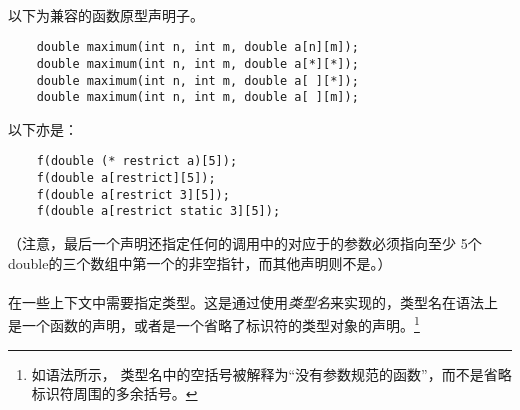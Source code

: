 {\paragraph{}
\ex 以下为兼容的函数原型声明子。
\begin{lstlisting}
    double maximum(int n, int m, double a[n][m]);
    double maximum(int n, int m, double a[*][*]);
    double maximum(int n, int m, double a[ ][*]);
    double maximum(int n, int m, double a[ ][m]);
\end{lstlisting}
以下亦是：
\begin{lstlisting}
    f(double (* restrict a)[5]);
    f(double a[restrict][5]);
    f(double a[restrict 3][5]);
    f(double a[restrict static 3][5]);
\end{lstlisting}
（注意，最后一个声明还指定任何的调用中的对应于的参数必须指向至少
5个double的三个数组中第一个的非空指针，而其他声明则不是。）


\syntax
\paragraph{}

\semantic
\paragraph{}
在一些上下文中需要指定类型。这是通过使用\textit{类型名}来实现的，类型名在语法上
是一个函数的声明，或者是一个省略了标识符的类型对象的声明。\footnote{如语法所示，
类型名中的空括号被解释为``没有参数规范的函数''，而不是省略标识符周围的多余括号。
}

}

